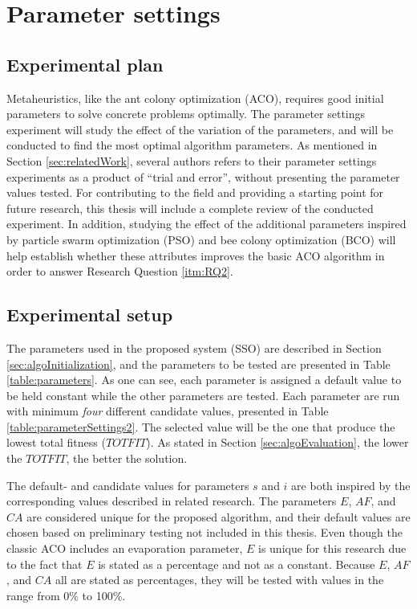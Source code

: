 \section{Parameter settings}
\label{sec:parametersettings}

\subsection{Experimental plan}
Metaheuristics, like the ant colony optimization (ACO), requires good initial parameters to solve concrete problems optimally. The parameter settings experiment will study the effect of the variation of the parameters, and will be conducted to find the most optimal algorithm parameters. As mentioned in Section \vref{sec:relatedWork}, several authors refers to their parameter settings experiments as a product of ``trial and error'', without presenting the parameter values tested. For contributing to the field and providing a starting point for future research, this thesis will include a complete review of the conducted experiment. %
In addition, studying the effect of the additional parameters inspired by particle swarm optimization (PSO) and bee colony optimization (BCO) will help establish whether these attributes improves the basic ACO algorithm in order to answer Research Question \vref{itm:RQ2}.

\subsection{Experimental setup}
\label{subsec:parameterSettings_setup}
The parameters used in the proposed system (SSO) are described in Section \vref{sec:algoInitialization}, and the parameters to be tested are presented in Table \ref{table:parameters}. As one can see, each parameter is assigned a default value to be held constant while the other parameters are tested. Each parameter are run with minimum \textit{four} different candidate values, presented in Table \vref{table:parameterSettings2}. The selected value will be the one that produce the lowest total fitness ($TOTFIT$). As stated in Section \vref{sec:algoEvaluation}, the lower the $TOTFIT$, the better the solution. 

The default- and candidate values for parameters $s$ and $i$ are both inspired by the corresponding values described in related research\citep{salehi-nezhad07, poorzahedy11, sedighpour14, kechagiopoulos14}. The parameters $E$, $AF$, and $CA$ are considered unique for the proposed algorithm, and their default values are chosen based on preliminary testing not included in this thesis. Even though the classic ACO includes an evaporation parameter, $E$ is unique for this research due to the fact that $E$ is stated as a percentage and not as a constant. Because $E$, $AF$, and $CA$ all are stated as percentages, they will be tested with values in the range from 0\% to 100\%. %


